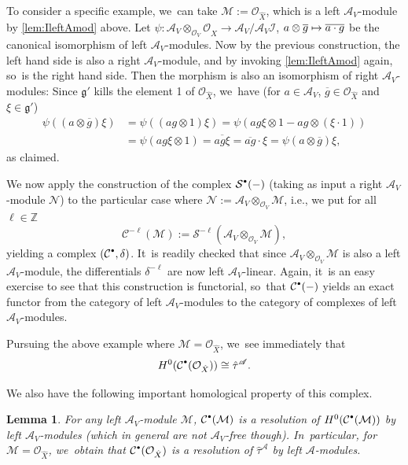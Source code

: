 \documentclass[11pt]{article}
\newcommand{\ie}{i.e.,\xspace}
\let\mathds\mathbb
\newcommand\mto{\mathchoice{\longmapsto}{\mapsto}{\mapsto}{\mapsto}}
\newcommand{\sbullet}{{\scriptscriptstyle\bullet}}
\newcommand{\csbullet}{{\raisebox{1pt}{$\sbullet$}}}
\newtheorem{lem}[thm]{Lemma}
\newcommand{\dZ}{{\mathds Z}}\let\mbz\dZ\let\Z\dZ
\newcommand{\cA}{\mathscr{A}}
\newcommand{\cC}{\mathcal{C}}
\newcommand{\cM}{\mathcal{M}}
\newcommand{\cN}{\mathcal{N}}
\newcommand{\cO}{\mathcal{O}}\let\O\cO
\newcommand{\cS}{\mathcal{S}}
\begin{document}
To consider a specific example, we~can take $\cM:=\cO_{\hat{X}}$, which is a left $\cA_V$\nobreakdash-mod\-ule by \cref{lem:IleftAmod} above.
Let $\psi\colon \mathscr{A}_V\otimes_{\mathcal{O}_V}\mathcal{O}_{\hat{X}}\to \mathscr{A}_V/\mathscr{A}_V\mathcal{I}$, $a\otimes \overline{g}\mto \overline{a\cdot g}$ be the canonical isomorphism of left $\mathscr{A}_V$\nobreakdash-mod\-ules. Now by the previous construction, the left hand side is also a right $\cA_V$\nobreakdash-mod\-ule, and by invoking \cref{lem:IleftAmod} again, so~is the right hand side. Then the morphism is also an isomorphism of right $\mathscr{A}_V$\nobreakdash-mod\-ules: Since $\mathfrak{g}'$ kills the element 1 of $\mathcal{O}_{\hat{X}}$, we~have (for $a\in \mathscr{A}_V$, $\overline{g}\in\cO_{\hat{X}}$ and $\xi\in \mathfrak{g}'$)
\begin{align*}
\psi((a\otimes \overline{g})\xi) &= \psi((ag\otimes 1)\xi)
= \psi(ag\xi\otimes 1 - ag\otimes (\xi\cdot 1))\\
&= \psi(ag\xi\otimes 1)= \overline{ag\xi}= \overline{ag}\cdot \xi= \psi(a\otimes \overline{g})\xi,
\end{align*}
as claimed.

We now apply the construction of the complex $\cS^{\csbullet}(-)$ (taking as input a right $\cA_V$\nobreakdash-mod\-ule $\cN$) to the particular case where $\cN:=\cA_V\otimes_{\cO_V}\cM$, \ie we put for all $\ell\in\dZ$
\[
\cC^{-\ell}(\cM):=\cS^{-\ell}(\cA_V\otimes_{\cO_V}\cM),
\]
yielding a complex $(\cC^{\csbullet}, \delta)$. It~is readily checked that since $\cA_V\otimes_{\cO_V}\cM$ is also a left $\cA_V$\nobreakdash-mod\-ule, the differentials $\delta^{-\ell}$ are now left $\cA_V$-linear. Again, it~is an easy exercise to see that this construction is functorial, so~that $\cC^{\csbullet}(-)$ yields an exact functor from the category of left $\cA_V$\nobreakdash-mod\-ules to the category of complexes of left $\cA_V$\nobreakdash-mod\-ules.

Pursuing the above example where $\cM=\cO_{\hat{X}}$, we~see immediately that
\[
H^0(\cC^{\csbullet}(\cO_{\hat{X}})) \cong \hat\tau^\cA.
\]

We also have the following important homological property of this complex.

\begin{lem}
For any left $\cA_V$\nobreakdash-mod\-ule $\cM$,
$\cC^{\csbullet}(\cM)$ is a resolution of $H^0(\cC^{\csbullet}(\cM))$ by left $\cA_V$\nobreakdash-mod\-ules
(which in general are not $\cA_V$-free though). In~particular, for $\cM=\cO_{\hat{X}}$, we~obtain
that $\cC^{\csbullet}(\cO_{\hat{X}})$ is a resolution of $\hat{\tau}^\cA$ by left $\cA$\nobreakdash-mod\-ules.
\end{lem}
\end{document}
